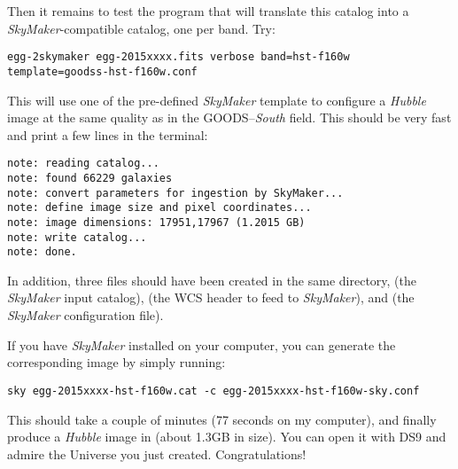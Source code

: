 \documentclass[12pt,a4paper]{article}
\newcommand{\skymaker}{\textit{SkyMaker}\xspace}
\newcommand{\hubble}{{\it Hubble}\xspace}
\begin{document}
Then it remains to test the program that will translate this catalog into a \skymaker-compatible catalog, one per band. Try:
\begin{verbatim}
egg-2skymaker egg-2015xxxx.fits verbose band=hst-f160w template=goodss-hst-f160w.conf
\end{verbatim}
This will use one of the pre-defined \skymaker template to configure a \hubble image at the same quality as in the GOODS--{\it South} field. This should be very fast and print a few lines in the terminal:
\begin{verbatim}
note: reading catalog...
note: found 66229 galaxies
note: convert parameters for ingestion by SkyMaker...
note: define image size and pixel coordinates...
note: image dimensions: 17951,17967 (1.2015 GB)
note: write catalog...
note: done.
\end{verbatim}
In addition, three files should have been created in the same directory,  (the \skymaker input catalog),  (the WCS header to feed to \skymaker), and  (the \skymaker configuration file).

If you have \skymaker installed on your computer, you can generate the corresponding image by simply running:
\begin{verbatim}
sky egg-2015xxxx-hst-f160w.cat -c egg-2015xxxx-hst-f160w-sky.conf
\end{verbatim}

This should take a couple of minutes (77 seconds on my computer), and finally produce a \hubble image in  (about 1.3GB in size). You can open it with DS9 and admire the Universe you just created. Congratulations!
\end{document}
